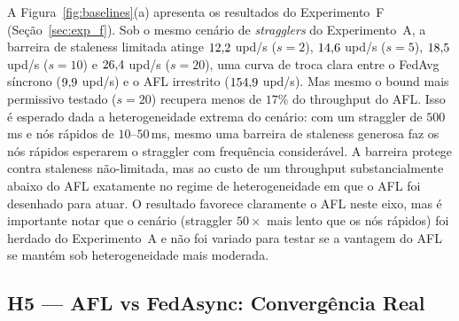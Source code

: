 \documentclass[conference,a4paper]{IEEEtran}
\begin{document}
A Figura~\ref{fig:baselines}(a) apresenta os resultados do Experimento~F
(Seção~\ref{sec:exp_f}). Sob o mesmo cenário de \textit{stragglers} do
Experimento~A, a barreira de staleness limitada atinge $12{,}2$ upd/s
($s=2$), $14{,}6$ upd/s ($s=5$), $18{,}5$ upd/s ($s=10$) e $26{,}4$ upd/s
($s=20$), uma curva de troca clara entre o FedAvg síncrono
($9{,}9$ upd/s) e o AFL irrestrito ($154{,}9$ upd/s). Mas mesmo o bound
mais permissivo testado ($s=20$) recupera menos de $17\%$ do throughput do
AFL. Isso é esperado dada a heterogeneidade extrema do cenário: com um
straggler de $500$\,ms e nós rápidos de $10$--$50$\,ms, mesmo uma barreira
de staleness generosa faz os nós rápidos esperarem o straggler com
frequência considerável. A barreira protege contra staleness não-limitada,
mas ao custo de um throughput substancialmente abaixo do AFL exatamente no
regime de heterogeneidade em que o AFL foi desenhado para atuar. O
resultado favorece claramente o AFL neste eixo, mas é importante notar que
o cenário (straggler $50\times$ mais lento que os nós rápidos) foi herdado
do Experimento~A e não foi variado para testar se a vantagem do AFL se
mantém sob heterogeneidade mais moderada.

\subsection{H5 --- AFL vs FedAsync: Convergência Real}
\end{document}

